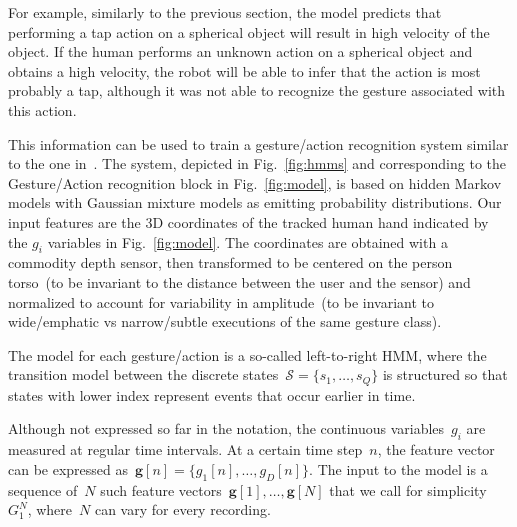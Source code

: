 For example, similarly to the previous section, the \AffWords{} model predicts that performing a tap action on a spherical object will result in high velocity of the object.
If the human performs an unknown action on a spherical object and obtains a high velocity, the robot will be able to infer that the action is most probably a tap, although it was not able to recognize the gesture associated with this action.

This information can be used to train a gesture/action recognition system similar to the one in~\cite{saponaro:2013:crhri}.
The system, depicted in Fig.~\ref{fig:hmms} and corresponding to the Gesture/Action recognition block in Fig.~\ref{fig:model}, is based on hidden Markov models with Gaussian mixture models as emitting probability distributions.
Our input features are the 3D coordinates of the tracked human hand indicated by the $g_i$ variables in Fig.~\ref{fig:model}.
The coordinates are obtained with a commodity depth sensor, then transformed to be centered on the person torso~(to be invariant to the distance between the user and the sensor) and normalized to account for variability in amplitude~(to be invariant to wide/emphatic vs narrow/subtle executions of the same gesture class).

The model for each gesture/action is a so-called left-to-right \ac{HMM}, where the transition model between the discrete states~$\mathcal{S} = \{s_1, \dots, s_Q\}$ is structured so that states with lower index represent events that occur earlier in time.

Although not expressed so far in the notation, the continuous variables~$g_i$ are measured at regular time intervals.
At a certain time step~$n$, the feature vector can be expressed as~$\mathbf{g}[n] = \{g_1[n], \dots, g_D[n]\}$.
The input to the model is a sequence of~$N$ such feature vectors~$\mathbf{g}[1], \dots, \mathbf{g}[N]$ that we call for simplicity~$G_1^N$, where~$N$ can vary for every recording.

